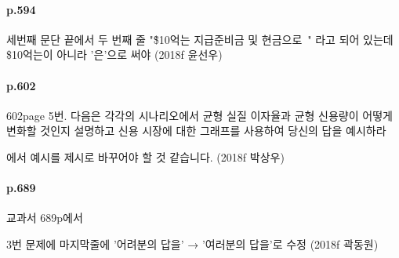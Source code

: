 \documentclass[a4paper]{article}
\begin{document}
\paragraph{p.594} %
\label{par:594}
세번째 문단 끝에서 두 번째 줄 "\~\$10억는 지급준비금 및 현금으로~" 라고 되어 있는데 \$10억는이 아니라 '은'으로 써야 (2018f 윤선우)
\paragraph{p.602} %
\label{par:p_602}
602page 5번. 다음은 각각의 시나리오에서 균형 실질 이자율과 균형 신용량이 어떻게 변화할 것인지 설명하고 
신용 시장에 대한 그래프를 사용하여 당신의 답을 예시하라 
 
에서 예시를 제시로 바꾸어야 할 것 같습니다. (2018f 박상우)


\paragraph{p.689} %
\label{par:p_689}
교과서 689p에서
 
3번 문제에 마지막줄에 '어려분의 답을' → '여러분의 답을'로 수정 (2018f 곽동원)
\end{document}
